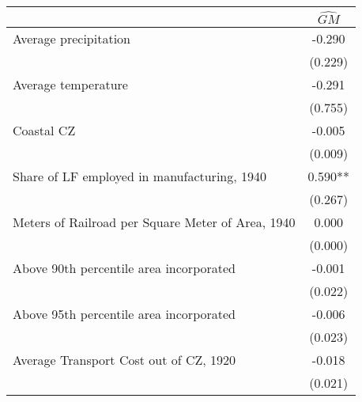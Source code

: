 \begin{tabular}{l*{1}{c}} \toprule
                &\multicolumn{1}{c}{$\widehat{GM}$}\\
\midrule
Average precipitation&   -0.290   \\
                &  (0.229)   \\
\addlinespace
Average temperature&   -0.291   \\
                &  (0.755)   \\
\addlinespace
Coastal CZ      &   -0.005   \\
                &  (0.009)   \\
\addlinespace
Share of LF employed in manufacturing, 1940&    0.590** \\
                &  (0.267)   \\
\addlinespace
Meters of Railroad per Square Meter of Area, 1940&    0.000   \\
                &  (0.000)   \\
\addlinespace
Above 90th percentile area incorporated&   -0.001   \\
                &  (0.022)   \\
\addlinespace
Above 95th percentile area incorporated&   -0.006   \\
                &  (0.023)   \\
\addlinespace
Average Transport Cost out of CZ, 1920&   -0.018   \\
                &  (0.021)   \\
       \bottomrule \end{tabular}
